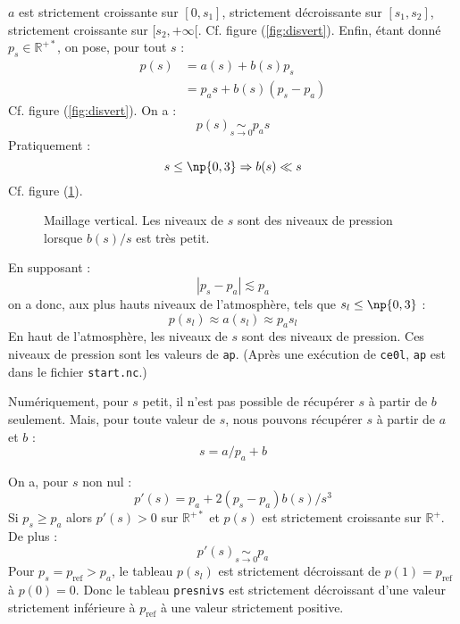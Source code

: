 \documentclass[a4paper,french]{article}
\begin{document}
$a$ est strictement croissante sur $[0, s_1]$,
strictement décroissante sur $[s_1, s_2]$, strictement
croissante sur $[s_2, + \infty[$. Cf. figure (\ref{fig:disvert}).
Enfin, étant donné $p_s \in \mathbb{R}^{+*}$, on pose, pour tout
$s$ :
\begin{align*}
  p(s) & = a(s) + b(s) p_s \\
  & = p_a s + b(s) (p_s - p_a)
\end{align*}
Cf. figure (\ref{fig:disvert}). On a :
\begin{displaymath}
  p(s) \underset{s \to 0}{\sim} p_a s
\end{displaymath}
Pratiquement :
\begin{displaymath}
  s \le \np{0,3} \Rightarrow b(s) \ll s
\end{displaymath}
Cf. figure (\ref{fig:b_s}).
\begin{figure}[htbp]
  \centering
  
  \caption[Maillage vertical : $b(s) / s$]{Maillage vertical. Les
    niveaux de $s$ sont des niveaux de pression lorsque $b(s) / s$ est
    très petit.}
  \label{fig:b_s}
\end{figure}
En supposant :
\begin{equation*}
  |p_s - p_a| \lesssim p_a  
\end{equation*}
on a donc, aux plus hauts niveaux de l'atmosphère, tels que $s_l \le
\np{0,3}$ :
\begin{displaymath}
  p(s_l) \approx a(s_l)
  \approx p_a s_l
\end{displaymath}
En haut de l'atmosphère, les niveaux de $s$ sont des niveaux de
pression. Ces niveaux de pression sont les valeurs de \verb+ap+.
(Après une exécution de \verb+ce0l+, \verb+ap+ est dans le
fichier \verb+start.nc+.)

Numériquement, pour $s$ petit, il n'est pas possible de récupérer $s$
à partir de $b$ seulement. Mais, pour toute valeur de $s$, nous pouvons
récupérer $s$ à partir de $a$ et $b$ :
\begin{displaymath}
  s = a / p_a + b
\end{displaymath}

On a, pour $s$ non nul :
\begin{displaymath}
  p'(s) = p_a + 2 (p_s - p_a) b(s) / s^3
\end{displaymath}
Si $p_s \ge p_a$ alors $p'(s) > 0$ sur $\mathbb{R}^{+*}$ et $p(s)$ est
strictement croissante sur $\mathbb{R}^+$. De plus :
\begin{displaymath}
    p'(s) \underset{s \to 0}{\sim} p_a
\end{displaymath}
Pour $p_s = p_\mathrm{ref} > p_a$, le tableau $p(s_l)$ est
strictement décroissant de $p(1) = p_\mathrm{ref}$ à $p(0) = 0$. Donc
le tableau \verb+presnivs+ est strictement décroissant d'une valeur
strictement inférieure à $p_\mathrm{ref}$ à une valeur strictement
positive.
\end{document}
